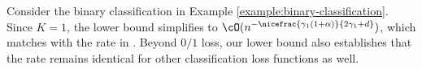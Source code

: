 \begin{remark} \label{remark:minimax-lower-bound}
    Consider the binary classification in Example \ref{example:binary-classification}. Since $K = 1$, the lower bound simplifies to $\cO(n^{-\nicefrac{\gamma_1 (1+ \alpha)}{2\gamma_1 + d}})$,  which matches with the rate in \citet[Theorem 3.5]{audibert2007Fast}. 
    Beyond $0/1$ loss, our lower bound also establishes that the rate remains identical for other classification loss functions as well. 
    
\end{remark}



